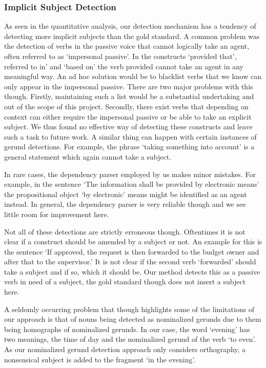 \documentclass[times, 10pt,twocolumn]{article}
\begin{document}
\subsubsection{Implicit Subject Detection}
As seen in the quantitative analysis, our detection mechanism has a tendency of detecting more implicit
subjects
than the gold standard. A common problem was the detection of verbs in the passive voice that cannot
logically take an agent, often referred to as `impersonal passive'.
In the constructs `provided that', referred to in' and `based on' the verb provided cannot take an agent
in any meaningful way. An ad hoc solution would be to blacklist verbs that we know can only appear
in the impersonal passive. There are two major problems with this though. Firstly, maintaining such
a list would be a substantial undertaking and out of the scope of this project. Secondly,
there exist verbs that depending on context can either require the impersonal passive or be
able to take an explicit subject. We thus found no effective way of detecting these
constructs and leave such a task
to future work. A similar thing can happen with certain instances of gerund detections. For example,
the phrase `taking something into account' is a general statement which again cannot take a subject.

In rare cases, the dependency parser employed by us makes minor mistakes. For example, in the sentence
`The information shall be provided by electronic means' the propositional object `by electronic' means
might be identified as an agent instead. In general, the dependency parser is very reliable though and we
see little room for improvement here.

Not all of these detections are strictly erroneous though. Oftentimes it is not clear if a
construct should be amended by a subject or not. An example for this is the sentence
`If approved, the request is then forwarded to the budget owner and after that to the supervisor.'
It is not clear if the second verb `forwarded' should take a subject and if so, which it should be.
Our method detects this as a passive verb in need of a subject, the gold standard though does not
insert a subject here.

A seldomly occurring problem that though highlights some of the limitations of our approach is
that of nouns being detected as nominalized gerunds due to them being homographs of nominalized gerunds.
In our case, the word `evening' has two meanings, the time of day and the nominalized gerund of the verb
`to even'. As our nominalized gerund detection approach only considers orthography, a nonsensical
subject is added to the fragment `in the evening'.
\end{document}
